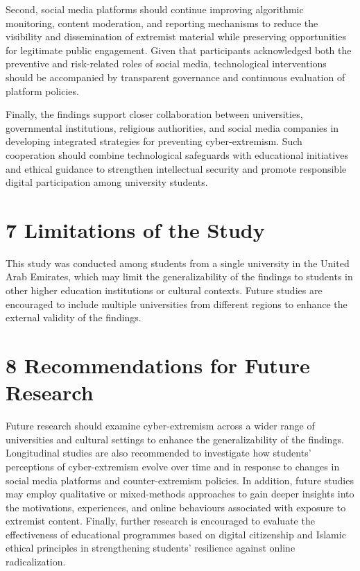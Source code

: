 \documentclass[10pt]{NSP1}
\begin{document}
	Second, social media platforms should continue improving algorithmic monitoring, content moderation, and reporting mechanisms to reduce the visibility and dissemination of extremist material while preserving opportunities for legitimate public engagement. Given that participants acknowledged both the preventive and risk-related roles of social media, technological interventions should be accompanied by transparent governance and continuous evaluation of platform policies.
	
	Finally, the findings support closer collaboration between universities, governmental institutions, religious authorities, and social media companies in developing integrated strategies for preventing cyber-extremism. Such cooperation should combine technological safeguards with educational initiatives and ethical guidance to strengthen intellectual security and promote responsible digital participation among university students.
	
	\section*{7 Limitations of the Study}
	
	This study was conducted among students from a single university in the United Arab Emirates, which may limit the generalizability of the findings to students in other higher education institutions or cultural contexts. Future studies are encouraged to include multiple universities from different regions to enhance the external validity of the findings.
	
	\section*{8 Recommendations for Future Research}
	
	Future research should examine cyber-extremism across a wider range of universities and cultural settings to enhance the generalizability of the findings. Longitudinal studies are also recommended to investigate how students' perceptions of cyber-extremism evolve over time and in response to changes in social media platforms and counter-extremism policies. In addition, future studies may employ qualitative or mixed-methods approaches to gain deeper insights into the motivations, experiences, and online behaviours associated with exposure to extremist content. Finally, further research is encouraged to evaluate the effectiveness of educational programmes based on digital citizenship and Islamic ethical principles in strengthening students' resilience against online radicalization.
	
\end{document}
